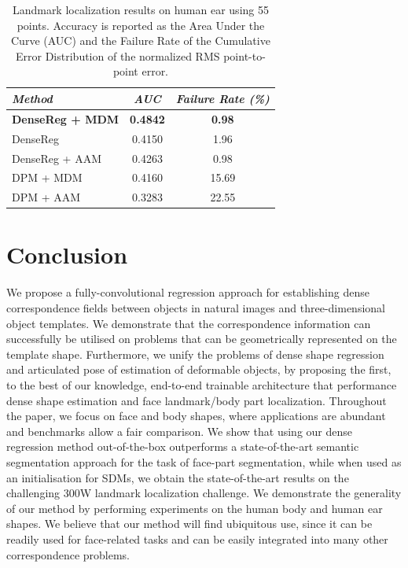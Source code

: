 \begin{table}[h!]
\centering
\begin{tabular}{|l|c|c|}
\hline
\emph{Method} & \emph{AUC} & \emph{Failure Rate (\%)}\\
\hline\hline
\textbf{DenseReg + MDM} & \textbf{0.4842} & \textbf{0.98} \\
DenseReg       &  0.4150 &   1.96 \\
DenseReg + AAM &  0.4263 &  0.98 \\
DPM + MDM      &  0.4160 &  15.69 \\
DPM + AAM      &  0.3283 &  22.55 \\
\hline
\end{tabular}
\caption{Landmark localization results on human ear using 55 points. Accuracy is reported as the Area Under the Curve (AUC) and the Failure Rate of the Cumulative Error Distribution of the normalized RMS point-to-point error.}
\label{tab:ears}
\end{table}


\section{Conclusion}\label{S:CONCLUSIONS}
We propose a fully-convolutional regression approach for establishing dense correspondence fields between objects in natural images and three-dimensional object templates. We demonstrate that the correspondence information can successfully be utilised on problems that can be geometrically represented on the template shape.
Furthermore, we unify the problems of dense shape regression and articulated pose of estimation of deformable objects, by proposing the first, to the best of our knowledge, end-to-end trainable architecture that performance dense shape estimation and face landmark/body part localization. Throughout the paper, we focus on face and body shapes, where applications are abundant and benchmarks allow a fair comparison. We show that using our dense regression method out-of-the-box  outperforms a state-of-the-art semantic segmentation approach for the task of face-part segmentation, while when used as an initialisation for SDMs,  we obtain the state-of-the-art results on the challenging 300W landmark localization challenge. We demonstrate the generality of our method by performing experiments on the human body and human ear shapes. We believe that our method will find ubiquitous use, since it can be readily used for face-related tasks and can be easily integrated into many other correspondence problems.

